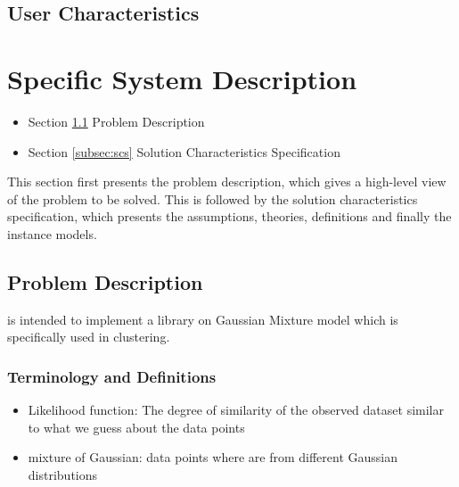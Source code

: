 \documentclass[12pt]{article}
\begin{document}
\subsection{User Characteristics} \label{SecUserCharacteristics}
\label{subsec:uc}

\section{Specific System Description}
\label{sec:ssd}

\begin{itemize}

\item Section \ref{subsec_pd} Problem Description
\item Section \ref{subsec:scs} Solution Characteristics Specification

\end{itemize}

This section first presents the problem description, which gives a high-level
view of the problem to be solved.  This is followed by the solution characteristics
specification, which presents the assumptions, theories, definitions and finally
the instance models. 

\subsection{Problem Description} 
\label{subsec_pd}

 is intended to implement a library on Gaussian Mixture model which is specifically used in clustering. 

\subsubsection{Terminology and Definitions}


\begin{itemize}

\item Likelihood function: The degree of similarity of the observed dataset similar to                            what we guess about the data points
\item mixture of Gaussian: data points where are from different                                                   Gaussian distributions
\end{itemize}
\end{document}
